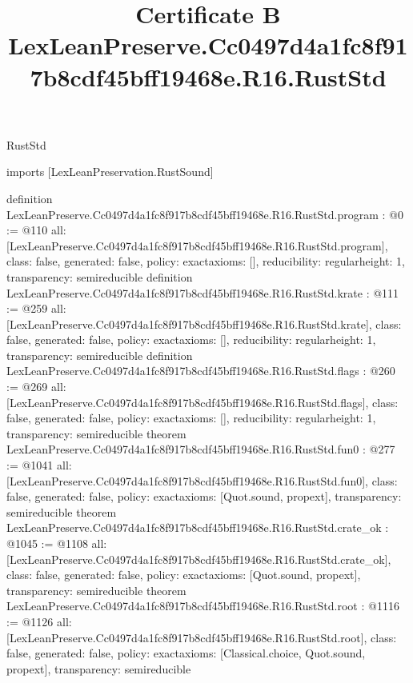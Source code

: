 \begin{lexlean}{RustStd}
\title{Certificate B LexLeanPreserve.Cc0497d4a1fc8f917b8cdf45bff19468e.R16.RustStd}
\begin{coremodule}
imports [LexLeanPreservation.RustSound]

definition LexLeanPreserve.Cc0497d4a1fc8f917b8cdf45bff19468e.R16.RustStd.program : @0 := @110 {
  all: [LexLeanPreserve.Cc0497d4a1fc8f917b8cdf45bff19468e.R16.RustStd.program],
  class: false,
  generated: false,
  policy: exact{axioms: []},
  reducibility: regular{height: 1},
  transparency: semireducible
}
definition LexLeanPreserve.Cc0497d4a1fc8f917b8cdf45bff19468e.R16.RustStd.krate : @111 := @259 {
  all: [LexLeanPreserve.Cc0497d4a1fc8f917b8cdf45bff19468e.R16.RustStd.krate],
  class: false,
  generated: false,
  policy: exact{axioms: []},
  reducibility: regular{height: 1},
  transparency: semireducible
}
definition LexLeanPreserve.Cc0497d4a1fc8f917b8cdf45bff19468e.R16.RustStd.flags : @260 := @269 {
  all: [LexLeanPreserve.Cc0497d4a1fc8f917b8cdf45bff19468e.R16.RustStd.flags],
  class: false,
  generated: false,
  policy: exact{axioms: []},
  reducibility: regular{height: 1},
  transparency: semireducible
}
theorem LexLeanPreserve.Cc0497d4a1fc8f917b8cdf45bff19468e.R16.RustStd.fun0 : @277 := @1041 {
  all: [LexLeanPreserve.Cc0497d4a1fc8f917b8cdf45bff19468e.R16.RustStd.fun0],
  class: false,
  generated: false,
  policy: exact{axioms: [Quot.sound, propext]},
  transparency: semireducible
}
theorem LexLeanPreserve.Cc0497d4a1fc8f917b8cdf45bff19468e.R16.RustStd.crate_ok : @1045 := @1108 {
  all: [LexLeanPreserve.Cc0497d4a1fc8f917b8cdf45bff19468e.R16.RustStd.crate_ok],
  class: false,
  generated: false,
  policy: exact{axioms: [Quot.sound, propext]},
  transparency: semireducible
}
theorem LexLeanPreserve.Cc0497d4a1fc8f917b8cdf45bff19468e.R16.RustStd.root : @1116 := @1126 {
  all: [LexLeanPreserve.Cc0497d4a1fc8f917b8cdf45bff19468e.R16.RustStd.root],
  class: false,
  generated: false,
  policy: exact{axioms: [Classical.choice, Quot.sound, propext]},
  transparency: semireducible
}


\end{coremodule}
\end{lexlean}
